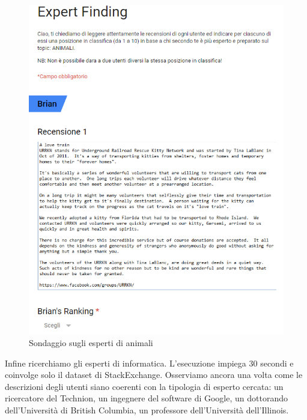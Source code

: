 \begin{figure}[H]
	\centering
	\includegraphics[scale=0.5]{image/form.PNG}
	\caption{Sondaggio sugli esperti di animali}
	\label{fig:frm}
\end{figure}

Infine ricerchiamo gli esperti di informatica. L'esecuzione impiega 30 secondi e coinvolge solo il dataset di StackExchange. Osserviamo ancora una volta come le descrizioni degli utenti siano coerenti con la tipologia di esperto cercata: un ricercatore del Technion, un ingegnere del software di Google, un dottorando dell'Università di British Columbia, un professore dell'Università dell'Illinois.


